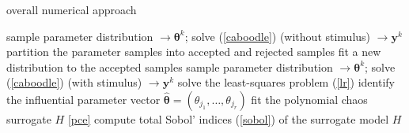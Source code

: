 \begin{algorithm}
\caption{overall numerical approach}\label{algo}
\begin{algorithmic}[1]
 
\State sample parameter distribution  $\longrightarrow \boldsymbol{\theta}^k$; solve (\ref{caboodle}) (without stimulus) $\longrightarrow \mathbf y^k$
\EndFor
\State partition the parameter samples into accepted and rejected samples
\State fit a new distribution to the accepted samples 
\EndWhile
{} 
\State sample parameter distribution  $\longrightarrow \boldsymbol{\theta}^k$; solve (\ref{caboodle}) (with stimulus) $\longrightarrow \mathbf y^k$
\EndFor
{}
\State solve the least-squares problem (\ref{lr}) 
\State identify the influential parameter vector $\hat{\boldsymbol\theta} =   (\theta_{j_1}, \dots, \theta_{j_r})$  
\State fit the polynomial chaos surrogate $H$ \eqref{pce} 
\State compute total Sobol' indices (\ref{sobol}) of the surrogate model $H$ 
\EndFor
\end{algorithmic}
\end{algorithm}




